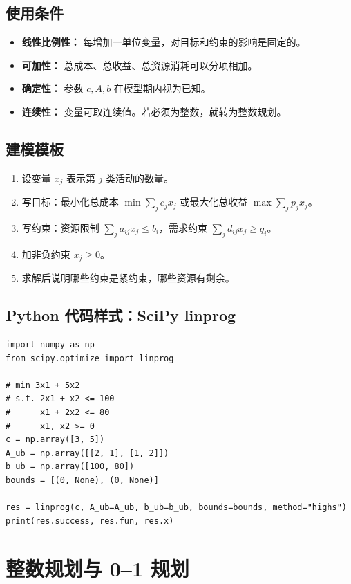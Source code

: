 \documentclass[11pt,a4paper]{ctexart}
\begin{document}
\subsection{使用条件}
\begin{itemize}
\item \textbf{线性比例性：} 每增加一单位变量，对目标和约束的影响是固定的。
\item \textbf{可加性：} 总成本、总收益、总资源消耗可以分项相加。
\item \textbf{确定性：} 参数 $c,A,b$ 在模型期内视为已知。
\item \textbf{连续性：} 变量可取连续值。若必须为整数，就转为整数规划。
\end{itemize}

\subsection{建模模板}
\begin{enumerate}
\item 设变量 $x_j$ 表示第 $j$ 类活动的数量。
\item 写目标：最小化总成本 $\min \sum_j c_jx_j$ 或最大化总收益 $\max \sum_j p_jx_j$。
\item 写约束：资源限制 $\sum_j a_{ij}x_j\le b_i$，需求约束 $\sum_j d_{ij}x_j\ge q_i$。
\item 加非负约束 $x_j\ge0$。
\item 求解后说明哪些约束是紧约束，哪些资源有剩余。
\end{enumerate}

\subsection{Python 代码样式：SciPy linprog}
\begin{lstlisting}
import numpy as np
from scipy.optimize import linprog

# min 3x1 + 5x2
# s.t. 2x1 + x2 <= 100
#      x1 + 2x2 <= 80
#      x1, x2 >= 0
c = np.array([3, 5])
A_ub = np.array([[2, 1], [1, 2]])
b_ub = np.array([100, 80])
bounds = [(0, None), (0, None)]

res = linprog(c, A_ub=A_ub, b_ub=b_ub, bounds=bounds, method="highs")
print(res.success, res.fun, res.x)
\end{lstlisting}

\section{整数规划与 0--1 规划}
\end{document}
